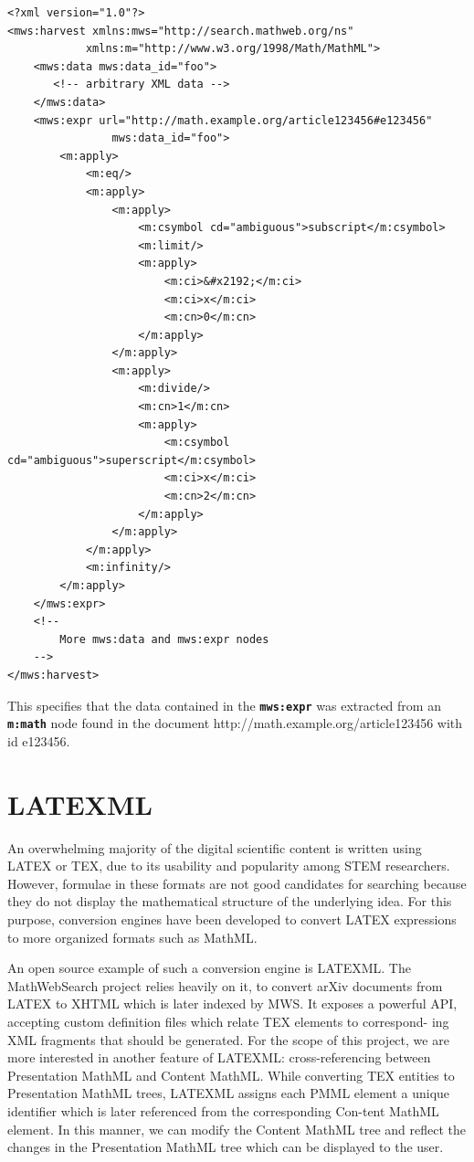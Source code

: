 \documentclass{deliverablereport}
\begin{document}
\lstset{language=XML}
\begin{lstlisting}
<?xml version="1.0"?>
<mws:harvest xmlns:mws="http://search.mathweb.org/ns" 
			xmlns:m="http://www.w3.org/1998/Math/MathML">
    <mws:data mws:data_id="foo">
       <!-- arbitrary XML data -->
    </mws:data>
    <mws:expr url="http://math.example.org/article123456#e123456"
    			mws:data_id="foo">
        <m:apply>
            <m:eq/>
            <m:apply>
                <m:apply>
                    <m:csymbol cd="ambiguous">subscript</m:csymbol>
                    <m:limit/>
                    <m:apply>
                        <m:ci>&#x2192;</m:ci>
                        <m:ci>x</m:ci>
                        <m:cn>0</m:cn>
                    </m:apply>
                </m:apply>
                <m:apply>
                    <m:divide/>
                    <m:cn>1</m:cn>
                    <m:apply>
                        <m:csymbol cd="ambiguous">superscript</m:csymbol>
                        <m:ci>x</m:ci>
                        <m:cn>2</m:cn>
                    </m:apply>
                </m:apply>
            </m:apply>
            <m:infinity/>
        </m:apply>
    </mws:expr>
    <!--
        More mws:data and mws:expr nodes
    -->
</mws:harvest>
\end{lstlisting}

\vspace{5mm}

This specifies that the data contained in the \textbf{\texttt{mws:expr}} was extracted from an \textbf{\texttt{m:math}} node found in the document http://math.example.org/article123456 with id e123456.

\section{LATEXML}\label{sec:ml}
An overwhelming majority of the digital scientific content is written using LATEX or TEX, due to its usability and popularity among STEM researchers. However, formulae in these formats are not good candidates for searching because they do not display the mathematical structure of the underlying idea. For this purpose, conversion engines have been developed to convert LATEX expressions to more organized formats such as MathML. \par
An open source example of such a conversion engine is LATEXML. The MathWebSearch project relies heavily on it, to convert arXiv documents from LATEX to XHTML which is later indexed by MWS. It exposes a powerful API, accepting custom definition files which relate TEX elements to correspond-
ing XML fragments that should be generated. For the scope of this project, we are more interested in another feature of LATEXML: cross-referencing between Presentation MathML and Content MathML. While converting TEX entities to Presentation MathML trees, LATEXML assigns each PMML element a unique identifier which is later referenced from the corresponding Con-tent MathML element. In this manner, we can modify the Content MathML tree and reflect the changes in the Presentation MathML tree which can be displayed to the user. \par 
\end{document}
